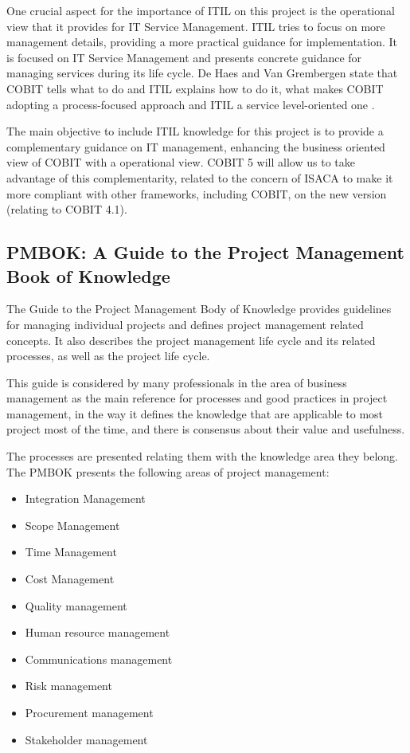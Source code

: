 One crucial aspect for the importance of ITIL on this project is the operational view that it provides for IT Service Management. ITIL tries to focus on more management details, providing a more practical guidance for implementation. It is focused on IT Service Management and presents concrete guidance for managing services during its life cycle. De Haes and Van Grembergen state that COBIT tells what to do and ITIL explains how to do it, what makes COBIT adopting a process-focused approach and ITIL a service level-oriented one \cite{ITGovAndMech}.\par
The main objective to include ITIL knowledge for this project is to provide a complementary guidance on IT management, enhancing the business oriented view of COBIT with a operational view. COBIT 5 will allow us to take advantage of this complementarity, related to the concern of ISACA to make it more compliant with other frameworks, including COBIT, on the new version (relating to COBIT 4.1). 

\subsection{PMBOK: A Guide to the Project Management Book of Knowledge}

The Guide to the Project Management Body of Knowledge provides guidelines for managing individual projects and defines project management related concepts. It also describes the project management life cycle and its related processes, as well as the project life cycle.\cite{pmbok5}\par
This guide is considered by many professionals in the area of business management as the main reference for processes and good practices in project management, in the way it defines the knowledge that are applicable to most project most of the time, and there is consensus about their value and usefulness.\par 
The processes are presented relating them with the knowledge area they belong. The PMBOK presents the following areas of project management:

\begin{itemize}
  \item Integration Management
  \item Scope Management
  \item Time Management
  \item Cost Management
  \item Quality management
  \item Human resource management
  \item Communications management
  \item Risk management
  \item Procurement management
  \item Stakeholder management
\end{itemize} 

